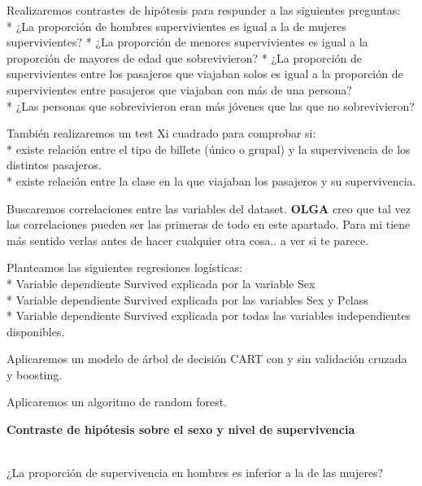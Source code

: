 \documentclass[
]{article}
\begin{document}
Realizaremos contrastes de hipótesis para respunder a las siguientes
preguntas:\\
* ¿La proporción de hombres supervivientes es igual a la de mujeres
supervivientes? * ¿La proporción de menores supervivientes es igual a la
proporción de mayores de edad que sobrevivieron? * ¿La proporción de
supervivientes entre los pasajeros que viajaban solos es igual a la
proporción de supervivientes entre pasajeros que viajaban con más de una
persona?\\
* ¿Las personas que sobrevivieron eran más jóvenes que las que no
sobrevivieron?

También realizaremos un test Xi cuadrado para comprobar si:\\
* existe relación entre el tipo de billete (único o grupal) y la
supervivencia de los distintos pasajeros.\\
* existe relación entre la clase en la que viajaban los pasajeros y su
supervivencia.

Buscaremos correlaciones entre las variables del dataset. \textbf{OLGA}
creo que tal vez las correlaciones pueden ser las primeras de todo en
este apartado. Para mi tiene más sentido verlas antes de hacer cualquier
otra cosa.. a ver si te parece.

Planteamos las siguientes regresiones logísticas:\\
* Variable dependiente Survived explicada por la variable Sex\\
* Variable dependiente Survived explicada por las variables Sex y
Pclass\\
* Variable dependiente Survived explicada por todas las variables
independientes disponibles.

Aplicaremos un modelo de árbol de decisión CART con y sin validación
cruzada y boosting.

Aplicaremos un algoritmo de random forest.

\textbf{Contraste de hipótesis sobre el sexo y nivel de supervivencia}

\texttt{}\\
¿La proporción de supervivencia en hombres es inferior a la de las
mujeres?
\end{document}
